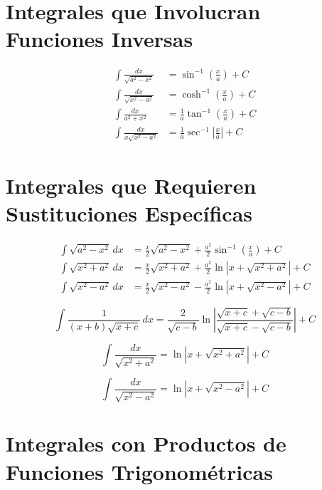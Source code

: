 \documentclass[11pt]{article}
\begin{document}
\section*{Integrales que Involucran Funciones Inversas}

\begin{align}
    \int \frac{dx}{\sqrt{a^2 - x^2}} &= \sin^{-1}\left(\frac{x}{a}\right) + C \\[10pt]
    \int \frac{dx}{\sqrt{x^2 - a^2}} &= \cosh^{-1}\left(\frac{x}{a}\right) + C \\[10pt]
    \int \frac{dx}{a^2 + x^2} &= \frac{1}{a} \tan^{-1}\left(\frac{x}{a}\right) + C \\[10pt]
    \int \frac{dx}{x \sqrt{x^2 - a^2}} &= \frac{1}{a} \sec^{-1}\left|\frac{x}{a}\right| + C
\end{align}

\section*{Integrales que Requieren Sustituciones Específicas}

\begin{align}
    \int \sqrt{a^2 - x^2} \, dx &= \frac{x}{2} \sqrt{a^2 - x^2} + \frac{a^2}{2} \sin^{-1}\left(\frac{x}{a}\right) + C \\[10pt]
    \int \sqrt{x^2 + a^2} \, dx &= \frac{x}{2} \sqrt{x^2 + a^2} + \frac{a^2}{2} \ln\left| x + \sqrt{x^2 + a^2} \right| + C \\[10pt]
    \int \sqrt{x^2 - a^2} \, dx &= \frac{x}{2} \sqrt{x^2 - a^2} - \frac{a^2}{2} \ln\left| x + \sqrt{x^2 - a^2} \right| + C 
\end{align}

\begin{equation}
\int \frac{1}{(x + b)\sqrt{x + c}} \, dx = 
\frac{2}{\sqrt{c - b}} \ln \left| 
\frac{ \sqrt{x + c} + \sqrt{c - b} }{ \sqrt{x + c} - \sqrt{c - b} } 
\right| + C
\end{equation}


\begin{equation}
    \int \frac{dx}{\sqrt{x^2 + a^2}} = \ln\left| x + \sqrt{x^2 + a^2} \right| + C
\end{equation}

\begin{equation}
    \int \frac{dx}{\sqrt{x^2 - a^2}} = \ln\left| x + \sqrt{x^2 - a^2} \right| + C
\end{equation}

\section*{Integrales con Productos de Funciones Trigonométricas}
\end{document}
